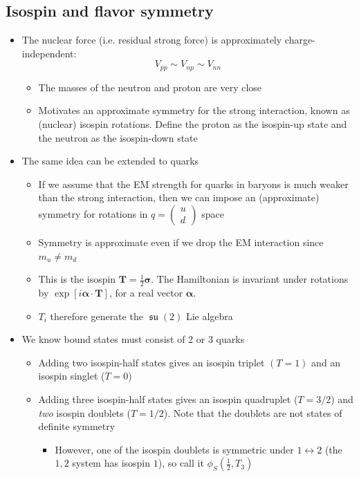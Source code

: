 \documentclass[11pt]{article}
\DeclareMathOperator{\su}{\mathfrak{su}}
\newcommand{\T}{\mathbf{T}}
\begin{document}
\subsection{Isospin and flavor symmetry}
\begin{itemize}
  \item The nuclear force (i.e. residual strong force) is approximately charge-independent:
  \begin{equation}
    V_{pp} \sim V_{np} \sim V_{nn}
  \end{equation}
  \begin{itemize}
    \item The masses of the neutron and proton are very close
    \item Motivates an approximate symmetry for the strong interaction, known as (nuclear) isospin rotations. Define the proton as the isospin-up state and the neutron as the isospin-down state
  \end{itemize}
  \item The same idea can be extended to quarks
  \begin{itemize}
    \item If we assume that the EM strength for quarks in baryons is much weaker than the strong interaction, then we can impose an (approximate) symmetry for rotations in $q = \begin{pmatrix} u \\ d \end{pmatrix}$ space
    \item Symmetry is approximate even if we drop the EM interaction since $m_u\neq m_d$
    \item This is the isospin $\T = \frac{1}{2}\bm\sigma$. The Hamiltonian is invariant under rotations by $\exp[i\bm\alpha\cdot\T]$, for a real vector $\bm\alpha$. 
    \item $T_i$ therefore generate the $\su(2)$ Lie algebra
  \end{itemize}
  \item We know bound states must consist of 2 or 3 quarks
  \begin{itemize}
    \item Adding two isospin-half states gives an isospin triplet $(T=1)$ and an isospin singlet ($T=0$)
    \item Adding three isospin-half states gives an isospin quadruplet ($T=3/2$) and \emph{two} isospin doublets ($T=1/2$). Note that the doublets are not states of definite symmetry
    \begin{itemize}
      \item However, one of the isospin doublets is symmetric under $1\leftrightarrow2$ (the $1,2$ system has isospin $1$), so call it $\phi_S\left(\frac{1}{2},T_3\right)$

\end{itemize}
\end{itemize}
\end{itemize}
\end{document}
